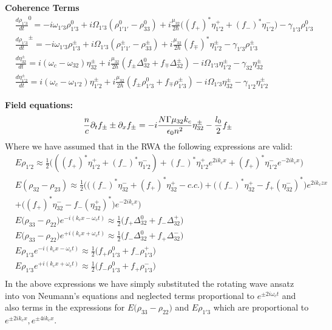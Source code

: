\documentclass[10pt,english,fleqn]{article}%
\begin{document}
\textbf{Coherence Terms}
\begin{align*}
&\frac{d \rho_{1'3}}{d t}^0  = -i\omega_{1'3}\rho_{1'3}^0 +i \Omega_{1'3}(\rho_{1'1'}^{0} - \rho_{33}^{0}) +i\frac{\mu_{32}}{2 \hbar}\big ((f_{+})^*\eta_{1'2}^{+}+(f_{-})^*\eta_{1'2}^{-} \big ) -\gamma_{1'3}\rho_{1'3}^{0} \\
&\frac{d \rho_{1'3}}{d t} ^\pm = -i\omega_{1'3}\rho_{1'3}^\pm  +i\Omega_{1'3}(\rho_{1'1'}^{\pm} - \rho_{33}^{\pm}) +i \frac{\mu_{32}}{2 \hbar} (f_{\mp})^* \eta_{1'2}^{\pm} 
- \gamma_{1'3} \rho_{1'3}^{\pm}\\
&\frac{d \eta_{32}^{\pm}}{d t}   = i(\omega_c - \omega_{32})\eta_{32}^{\pm} +i \frac{\mu_{32}}{2\hbar}(  f_{\pm}\Delta_{32}^{0} + f_{\mp}\Delta_{32}^{\pm} ) - i\Omega_{1'3}\eta_{1'2}^{\pm}
- \gamma_{32}\eta_{32}^\pm \\
&\frac{d \eta_{1'2}^\pm}{d t}  = i(\omega_c - \omega_{1'2})\eta_{1'2}^{\pm} +i \frac{\mu_{32}}{2\hbar}(f_{\pm }\rho_{1'3}^0 + f_{\mp} \rho_{1'3}^{\pm}) -  i\Omega_{1'3}\eta_{32}^{\pm}
- \gamma_{1'2}\eta_{1'2}^\pm
\end{align*}

\textbf{Field equations:}
$$
\frac{n}{c}\partial_t f_{\pm} \pm \partial_{x}f_{\pm} = -i\frac{N \Gamma \mu_{32} k_c}{\epsilon_0 n^2} \eta_{32}^{\pm} - \frac{l_0}{2} f_{\pm} \label{eq:rtwaveq} \\
$$
Where we have assumed that in the RWA the following expressions are valid:
\begin{align}
  	&E\rho_{1'2} \approx \frac{1}{2} \Big(  ((f_{+})^*\eta_{1'2}^{+}+(f_{-})^*\eta_{1'2}^{-} ) + (f_{-})^* \eta_{1'2}^{+}e^{2ik_cx} + (f_{+})^* \eta_{1'2}^{-}e^{-2ik_cx} \Big) \nonumber \\
  	& E (\rho_{32}-\rho_{23}) \approx \frac{1}{2 }\Big (  \big ((f_{-})^*\eta_{32}^{-}+(f_{+})^*\eta_{32}^{+} - c.c. \big ) + \big ( (f_{-})^*\eta_{32}^{+}-f_{+}(\eta_{32}^{-})^* \big )e^{2ik_c zx} \nonumber \\ 
  	& + \big( (f_{+})^{*}\eta_{32}^{-}-f_{-}(\eta_{32}^{+})^{*} \big)e^{-2ik_cx} \Big )  \nonumber \\
	&E \big( \rho_{33}-\rho_{22} \big ) e^{-i (k_c x- \omega_c t ) } \approx \frac{1}{2} \Big (  f_{+}\Delta_{32}^{0}+f_{-}\Delta_{32}^{+}\Big ) \nonumber \\
	&E \big( \rho_{33}-\rho_{22} \big ) e^{+i (k_c x+ \omega_c t ) } \approx \frac{1}{2} \Big (  f_{-}\Delta_{32}^{0}+f_{+}\Delta_{32}^{-}\Big ) \nonumber \\
	&E \rho_{1'3} e^{-i (k_c x- \omega_c t ) } \approx \frac{1}{2} \Big (  f_{+}\rho_{1'3}^{0}+f_{-}\rho_{1'3}^{+}\Big ) \nonumber \\
	&E \rho_{1'3} e^{+i (k_c x+ \omega_c t ) } \approx \frac{1}{2} \Big (  f_{-}\rho_{1'3}^{0}+f_{+}\rho_{1'3}^{-}\Big ) \nonumber \\
\end{align}
In the above expressions we have simply substituted the rotating wave ansatz into von Neumann's equations and neglected terms proportional to $e^{\pm 2i\omega_c t}$ and also terms in the expressions for $E \big( \rho_{33}-\rho_{22} \big )$ and $E \rho_{1'3} $ which are proportional to $e^{\pm 2ik_c x},e^{\pm 4ik_c x} $.
\end{document}

